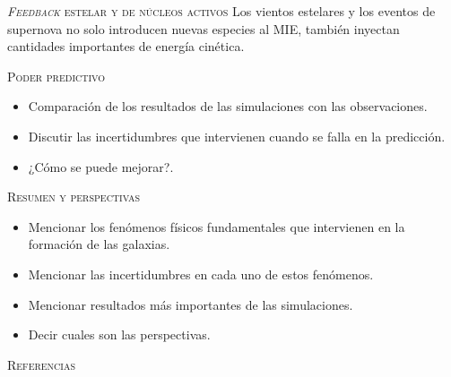 \documentclass[xcolor=dvipsnames,4pt,hyperref={colorlinks,citecolor=black,linkcolor=black,urlcolor=black}]{beamer}
\begin{document}
\begin{frame}[allowframebreaks]{\textsc{\emph{Feedback} estelar y de núcleos activos}}
%
Los vientos estelares y los eventos de supernova no solo introducen nuevas especies al MIE, también
inyectan cantidades importantes de energía cinética.
%
\end{frame}

\begin{frame}[allowframebreaks]{\textsc{Poder predictivo}}
%
\begin{itemize}
\item Comparación de los resultados de las simulaciones con las observaciones.
\item Discutir las incertidumbres que intervienen cuando se falla en la predicción.
\item ¿Cómo se puede mejorar?.
\end{itemize}
%
\end{frame}

\begin{frame}[allowframebreaks]{\textsc{Resumen y perspectivas}}
%
\begin{itemize}
\item Mencionar los fenómenos físicos fundamentales que intervienen en la formación de las galaxias.
\item Mencionar las incertidumbres en cada uno de estos fenómenos.
\item Mencionar resultados más importantes de las simulaciones.
\item Decir cuales son las perspectivas.
\end{itemize}
%
\end{frame}

\begin{frame}[allowframebreaks]{\textsc{Referencias}}
\printbibliography
\end{frame}
\end{document}
